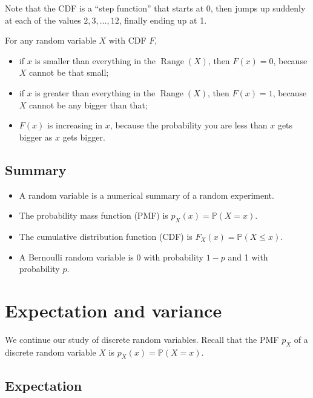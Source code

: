 \documentclass[
  letterpaper,
  DIV=11,
  numbers=noendperiod]{scrreprt}
\providecommand{\tightlist}{%
  \setlength{\itemsep}{0pt}\setlength{\parskip}{0pt}}\usepackage{longtable,booktabs,array}
\theoremstyle{remark}
\begin{document}
Note that the CDF is a ``step function'' that starts at 0, then jumps up
suddenly at each of the values \(2, 3, \dots, 12\), finally ending up at
1.

For any random variable \(X\) with CDF \(F\),

\begin{itemize}
\tightlist
\item
  if \(x\) is smaller than everything in the
  \(\operatorname{Range}(X)\), then \(F(x) = 0\), because \(X\) cannot
  be that small;
\item
  if \(x\) is greater than everything in the
  \(\operatorname{Range}(X)\), then \(F(x) = 1\), because \(X\) cannot
  be any bigger than that;
\item
  \(F(x)\) is increasing in \(x\), because the probability you are less
  than \(x\) gets bigger as \(x\) gets bigger.
\end{itemize}

\hypertarget{summary-L09}{%
\section*{Summary}\label{summary-L09}}


\begin{itemize}
\tightlist
\item
  A random variable is a numerical summary of a random experiment.
\item
  The probability mass function (PMF) is \(p_X(x) = \mathbb P(X = x)\).
\item
  The cumulative distribution function (CDF) is
  \(F_X(x) = \mathbb P(X \leq x)\).
\item
  A Bernoulli random variable is 0 with probability \(1-p\) and 1 with
  probability \(p\).
\end{itemize}

\hypertarget{L10-expectation}{%
\chapter{Expectation and variance}\label{L10-expectation}}

We continue our study of discrete random variables. Recall that the PMF
\(p_X\) of a discrete random variable \(X\) is
\(p_X(x) = \mathbb P(X = x)\).

\hypertarget{expectation}{%
\section{Expectation}\label{expectation}}
\end{document}
